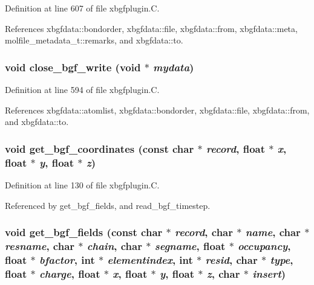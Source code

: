 Definition at line 607 of file xbgfplugin.C.

References xbgfdata::bondorder, xbgfdata::file, xbgfdata::from, xbgfdata::meta, molfile\_\-metadata\_\-t::remarks, and xbgfdata::to.
\subsubsection{\setlength{\rightskip}{0pt plus 5cm}void close\_\-bgf\_\-write (void $\ast$ {\em mydata})\hspace{0.3cm}{\tt  [static]}}\label{xbgfplugin_8C_a14}




Definition at line 594 of file xbgfplugin.C.

References xbgfdata::atomlist, xbgfdata::bondorder, xbgfdata::file, xbgfdata::from, and xbgfdata::to.
\subsubsection{\setlength{\rightskip}{0pt plus 5cm}void get\_\-bgf\_\-coordinates (const char $\ast$ {\em record}, float $\ast$ {\em x}, float $\ast$ {\em y}, float $\ast$ {\em z})\hspace{0.3cm}{\tt  [static]}}\label{xbgfplugin_8C_a4}




Definition at line 130 of file xbgfplugin.C.

Referenced by get\_\-bgf\_\-fields, and read\_\-bgf\_\-timestep.
\subsubsection{\setlength{\rightskip}{0pt plus 5cm}void get\_\-bgf\_\-fields (const char $\ast$ {\em record}, char $\ast$ {\em name}, char $\ast$ {\em resname}, char $\ast$ {\em chain}, char $\ast$ {\em segname}, float $\ast$ {\em occupancy}, float $\ast$ {\em bfactor}, int $\ast$ {\em elementindex}, int $\ast$ {\em resid}, char $\ast$ {\em type}, float $\ast$ {\em charge}, float $\ast$ {\em x}, float $\ast$ {\em y}, float $\ast$ {\em z}, char $\ast$ {\em insert})\hspace{0.3cm}{\tt  [static]}}\label{xbgfplugin_8C_a5}




